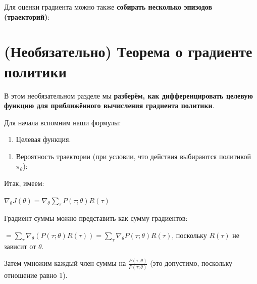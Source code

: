 \documentclass[11pt,a4paper]{article}
\begin{document}
Для оценки градиента можно также \textbf{собирать несколько эпизодов (траекторий)}:


\section{(Необязательно) Теорема о градиенте политики}\label{optional-the-policy-gradient-theorem}

В этом необязательном разделе мы \textbf{разберём, как дифференцировать целевую функцию для приближённого вычисления градиента политики}.

Для начала вспомним наши формулы:

\begin{enumerate}
\def\labelenumi{\arabic{enumi}.}
\tightlist
\item
  Целевая функция.
\end{enumerate}


\begin{enumerate}
\def\labelenumi{\arabic{enumi}.}
\setcounter{enumi}{1}
\tightlist
\item
  Вероятность траектории (при условии, что действия выбираются политикой \(\pi_\theta\)):
\end{enumerate}


Итак, имеем:

\(\nabla_\theta J(\theta) =  \nabla_\theta \sum_{\tau}P(\tau;\theta)R(\tau)\)

Градиент суммы можно представить как сумму градиентов:

\(=  \sum_{\tau} \nabla_\theta (P(\tau;\theta)R(\tau)) = \sum_{\tau} \nabla_\theta P(\tau;\theta)R(\tau)\), поскольку \(R(\tau)\) не зависит от \(\theta\).

Затем умножим каждый член суммы на \(\frac{P(\tau;\theta)}{P(\tau;\theta)}\) (это допустимо, поскольку отношение равно 1).
\end{document}
